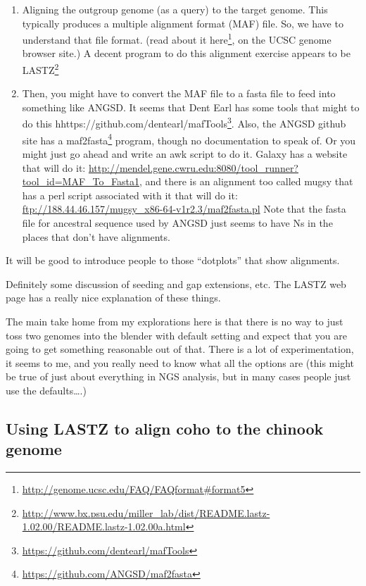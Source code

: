 \documentclass[]{krantz}
\renewcommand{\href}[2]{#2\footnote{\url{#1}}}
\begin{document}
\begin{enumerate}
\def\labelenumi{\arabic{enumi}.}
\item
  Aligning the outgroup genome (as a query) to the target genome. This typically
  produces a multiple alignment format (MAF) file. So, we have to understand that
  file format. (read about it \href{http://genome.ucsc.edu/FAQ/FAQformat\#format5}{here}, on the
  UCSC genome browser site.) A decent program to do this alignment exercise appears to
  be \href{http://www.bx.psu.edu/miller_lab/dist/README.lastz-1.02.00/README.lastz-1.02.00a.html}{LASTZ}
\item
  Then, you might have to convert the MAF file to a fasta file to feed into something
  like ANGSD. It seems that Dent Earl has some tools that might to do this \href{https://github.com/dentearl/mafTools}{hhttps://github.com/dentearl/mafTools}. Also, the ANGSD github site has a \href{https://github.com/ANGSD/maf2fasta}{maf2fasta} program, though no
  documentation to speak of. Or you might just go ahead and write an awk script to do it.
  Galaxy has a website that will do it: \url{http://mendel.gene.cwru.edu:8080/tool_runner?tool_id=MAF_To_Fasta1}, and there is an alignment too called mugsy
  that has a perl script associated with it that will do it: \url{ftp://188.44.46.157/mugsy_x86-64-v1r2.3/maf2fasta.pl}
  Note that the fasta file for ancestral sequence used by ANGSD just seems to have Ns in the places that don't have alignments.
\end{enumerate}

It will be good to introduce people to those ``dotplots'' that show alignments.

Definitely some discussion of seeding and gap extensions, etc. The LASTZ web page has a
really nice explanation of these things.

The main take home from my explorations here is that there is no way to just toss two
genomes into the blender with default setting and expect that you are going to get
something reasonable out of that. There is a lot of experimentation, it seems to me, and
you really need to know what all the options are (this might be true of just about
everything in NGS analysis, but in many cases people just use the defaults\ldots{}.)

\hypertarget{using-lastz-to-align-coho-to-the-chinook-genome}{%
\subsection{Using LASTZ to align coho to the chinook genome}\label{using-lastz-to-align-coho-to-the-chinook-genome}}
\end{document}

